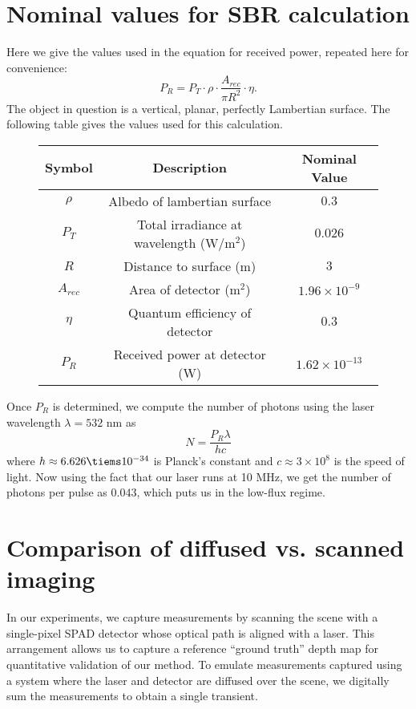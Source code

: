 \documentclass[runningheads]{llncs}
\begin{document}
\section{Nominal values for SBR calculation}
Here we give the values used in the equation for received power, repeated here
for convenience:
  \begin{equation}
    P_R = P_T \cdot \rho \cdot \frac{A_{rec}}{\pi R^2} \cdot \eta.
  \end{equation}
The object in question is a vertical, planar, perfectly Lambertian surface. The following table gives the values used for this calculation.
\begin{figure}[H]
  \centering
  \begin{tabular}{c|c|c}
    \toprule
    Symbol & Description & Nominal Value \\
    \midrule
    $\rho$  & Albedo of lambertian surface & $0.3$ \\
    $P_T$ & Total irradiance at wavelength (W/$\text{m}^2$) & $0.026$ \\
    $R$ & Distance to surface (m) & $3$ \\
    $A_{rec}$ & Area of detector ($\text{m}^2$) & $1.96 \times 10^{-9}$ \\
    $\eta$ & Quantum efficiency of detector & $0.3$ \\
    $P_R$ & Received power at detector (W) & $1.62 \times 10^{-13}$ \\
    \bottomrule
  \end{tabular}
  \caption{}
  \label{fig:sbr_calculation}
\end{figure}
Once $P_R$ is determined, we compute the number of photons using the laser
wavelength $\lambda = 532$ nm as
\begin{equation}
  N = \frac{P_R\lambda}{hc}
\end{equation}
where $h \approx 6.626 \tiems 10^{-34}$ is Planck's constant and $c \approx 3
\times 10^8$ is the speed of light. Now using the fact that our laser runs at 10
MHz, we get the number of photons per pulse as $0.043$, which puts us in the
low-flux regime.

\section{Comparison of diffused vs. scanned imaging}
In our experiments, we capture measurements by scanning the scene with a
single-pixel SPAD detector whose optical path is aligned with a laser. This
arrangement allows us to capture a reference ``ground truth'' depth map for
quantitative validation of our method. To emulate measurements captured using a
system where the laser and detector are diffused over the scene, we digitally
sum the measurements to obtain a single transient. 
\end{document}
